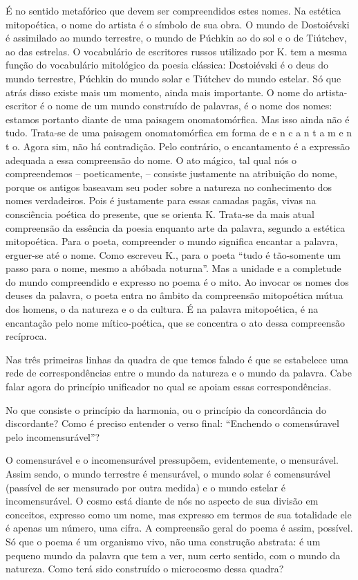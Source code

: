É no sentido metafórico que devem ser compreendidos estes nomes. Na
estética mitopoética, o nome do artista é o símbolo de sua obra. O mundo
de Dostoiévski é assimilado ao mundo terrestre, o mundo de Púchkin ao do
sol e o de Tiútchev, ao das estrelas. O vocabulário de escritores russos
utilizado por K. tem a mesma função do vocabulário mitológico da poesia
clássica: Dostoiévski é o deus do mundo terrestre, Púchkin do mundo
solar e Tiútchev do mundo estelar. Só que atrás disso existe mais um
momento, ainda mais importante. O nome do artista-escritor é o nome de
um mundo construído de palavras, é o nome dos nomes: estamos portanto
diante de uma paisagem onomatomórfica. Mas isso ainda não é tudo.
Trata-se de uma paisagem onomatomórfica em forma de e n c a n t a m e n
t o. Agora sim, não há contradição. Pelo contrário, o encantamento é a
expressão adequada a essa compreensão do nome. O ato mágico, tal qual
nós o compreendemos -- poeticamente, -- consiste justamente na
atribuição do nome, porque os antigos baseavam seu poder sobre a
natureza no conhecimento dos nomes verdadeiros. Pois é justamente para
essas camadas pagãs, vivas na consciência poética do presente, que se
orienta K. Trata-se da mais atual compreensão da essência da poesia
enquanto arte da palavra, segundo a estética mitopoética. Para o poeta,
compreender o mundo significa encantar a palavra, erguer-se até o nome.
Como escreveu K., para o poeta ``tudo é tão-somente um passo para o
nome, mesmo a abóbada noturna''. Mas a unidade e a completude do mundo
compreendido e expresso no poema é o mito. Ao invocar os nomes dos
deuses da palavra, o poeta entra no âmbito da compreensão mitopoética
mútua dos homens, o da natureza e o da cultura. É na palavra
mitopoética, é na encantação pelo nome mítico-poética, que se concentra
o ato dessa compreensão recíproca.

Nas três primeiras linhas da quadra de que temos falado é que se
estabelece uma rede de correspondências entre o mundo da natureza e o
mundo da palavra. Cabe falar agora do princípio unificador no qual se
apoiam essas correspondências.

No que consiste o princípio da harmonia, ou o princípio da concordância
do discordante? Como é preciso entender o verso final: ``Enchendo o
comensúravel pelo incomensurável''?

O comensurável e o incomensurável pressupõem, evidentemente, o
mensurável. Assim sendo, o mundo terrestre é mensurável, o mundo solar é
comensurável (passível de ser mensurado por outra medida) e o mundo
estelar é incomensurável. O cosmo está diante de nós no aspecto de sua
divisão em conceitos, expresso como um nome, mas expresso em termos de
sua totalidade ele é apenas um número, uma cifra. A compreensão geral do
poema é assim, possível. Só que o poema é um organismo vivo, não uma
construção abstrata: é um pequeno mundo da palavra que tem a ver, num
certo sentido, com o mundo da natureza. Como terá sido construído o
microcosmo dessa quadra?

